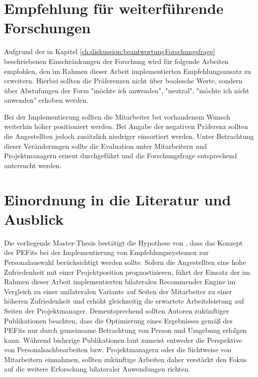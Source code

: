 \section{Empfehlung für weiterführende Forschungen}
\label{ch:diskussion:empfehlung}
Aufgrund der in Kapitel \ref{ch:diskussion:beantwortungForschungsfrage} beschriebenen Einschränkungen der Forschung wird für folgende Arbeiten empfohlen, den im Rahmen dieser Arbeit implementierten Empfehlungsansatz zu erweitern. Hierbei sollten die Präferenzen nicht über boolesche Werte, sondern über Abstufungen der Form "möchte ich anwenden", "neutral", "möchte ich nicht anwenden" erhoben werden.

Bei der Implementierung sollten die Mitarbeiter bei vorhandenem Wunsch weiterhin höher positioniert werden. Bei Angabe der negativen Präferenz sollten die Angestellten jedoch zusätzlich niedriger einsortiert werden. Unter Betrachtung dieser Veränderungen sollte die Evaluation unter Mitarbeitern und Projektmanagern erneut durchgeführt und die Forschungsfrage entsprechend untersucht werden.

\section{Einordnung in die Literatur und Ausblick}
\label{ch:diskussion:einordnung}
Die vorliegende Master-Thesis bestätigt die Hypothese von \textcite{malinowski:2008}, dass das Konzept des \acp{PEFit} bei der Implementierung von Empfehlungssystemen zur Personalauswahl berücksichtigt werden sollte. Sofern die Angestellten eine hohe Zufriedenheit mit einer Projektposition prognostizieren, führt der Einsatz der im Rahmen dieser Arbeit implementierten bilateralen Recommender Engine im Vergleich zu einer unilateralen Variante auf Seiten der Mitarbeiter zu einer höheren Zufriedenheit und erhöht gleichzeitig die erwartete Arbeitsleistung auf Seiten der Projektmanager. Dementsprechend sollten Autoren zukünftiger Publikationen beachten, dass die Optimierung eines Ergebnisses gemäß des \acp{PEFit} nur durch gemeinsame Betrachtung von Person und Umgebung erfolgen kann. Während bisherige Publikationen laut \textcite{malinowski:2008} zumeist entweder die Perspektive von Personalsachbearbeiten bzw. Projektmanagern oder die Sichtweise von Mitarbeitern einnahmen, sollten zukünftige Arbeiten daher verstärkt den Fokus auf die weitere Erforschung bilateraler Anwendungen richten.
